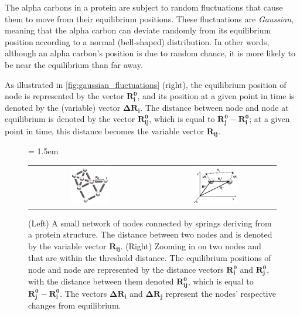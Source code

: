 The alpha carbons in a protein are subject to random fluctuations that cause them to move from their equilibrium positions. These fluctuations are \textit{Gaussian}, meaning that the alpha carbon can deviate randomly from its equilibrium position according to a normal (bell-shaped) distribution. In other words, although an alpha carbon's position is due to random chance, it is more likely to be near the equilibrium than far away.

As illustrated in \autoref{fig:gaussian_fluctuations} (right), the equilibrium position of node  is represented by the vector $\mathbf{R_i^0}$, and its position at a given point in time is denoted by the (variable) vector $ \mathbf{\Delta R_i}$. The distance between node  and node  at equilibrium is denoted by the vector $\mathbf{R_{ij}^0}$, which is equal to $\mathbf{R_j^0} - \mathbf{R_i^0}$; at a given point in time, this distance becomes the variable vector $\mathbf{R_{ij}}$.\\

\begin{figure}[h]
	\centering
	\tabcolsep = 1.5em
	\mySfFamily
	\begin{tabular}{c c}
		\includegraphics[width = 0.33\textwidth]{../images/gaussian_network_small.png} & \includegraphics[width = 0.4\textwidth]{../images/gaussian_network_vectors.png}
	\end{tabular}
	\caption{(Left) A small network of nodes connected by springs deriving from a protein structure. The distance between two nodes  and  is denoted by the variable vector $\textbf{R}_\textbf{ij}$. (Right) Zooming in on two nodes  and  that are within the threshold distance. The equilibrium positions of node  and node  are represented by the distance vectors $ \textbf{R}_\textbf{i}^\textbf{0} $ and $\textbf{R}_\textbf{j}^\textbf{0}$, with the distance between them denoted $\textbf{R}_{\textbf{ij}}^\textbf{0}$, which is equal to $\textbf{R}_\textbf{j}^\textbf{0} - \textbf{R}_\textbf{i}^\textbf{0}$. The vectors $\mathbf{\Delta} \textbf{R}_\textbf{i} $ and $ \mathbf{\Delta} \textbf{R}_\textbf{j}$ represent the nodes' respective changes from equilibrium.}
	\label{fig:gaussian_fluctuations}
\end{figure}

